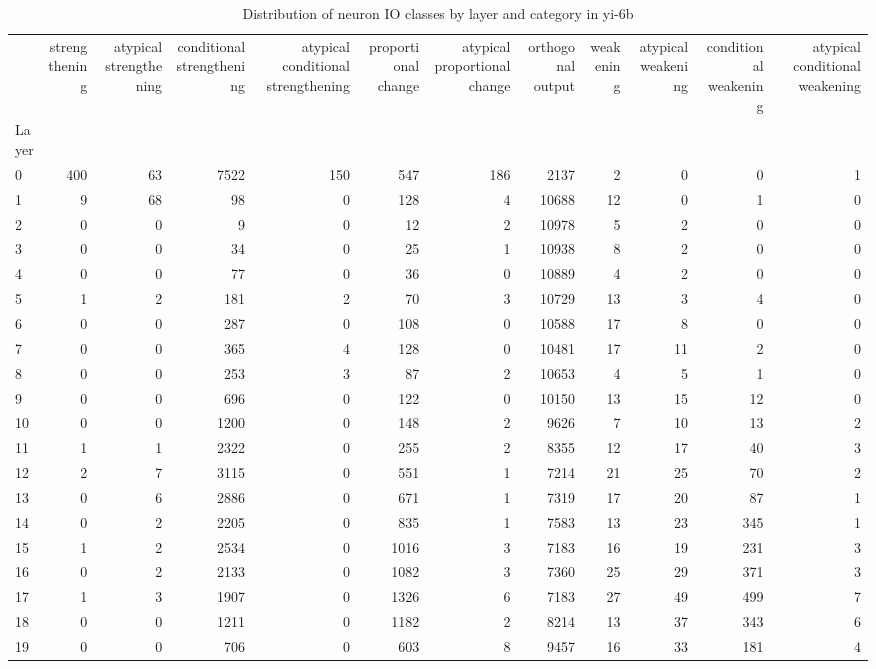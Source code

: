 \begin{table}
\caption{Distribution of neuron IO classes by layer and category in yi-6b}
\label{tab:yi-6b}
\begin{tabular}{lrrrrrrrrrrr}
 & strengthening & atypical strengthening & conditional strengthening & atypical conditional strengthening & proportional change & atypical proportional change & orthogonal output & weakening & atypical weakening & conditional weakening & atypical conditional weakening \\
Layer &  &  &  &  &  &  &  &  &  &  &  \\
0 & 400 & 63 & 7522 & 150 & 547 & 186 & 2137 & 2 & 0 & 0 & 1 \\
1 & 9 & 68 & 98 & 0 & 128 & 4 & 10688 & 12 & 0 & 1 & 0 \\
2 & 0 & 0 & 9 & 0 & 12 & 2 & 10978 & 5 & 2 & 0 & 0 \\
3 & 0 & 0 & 34 & 0 & 25 & 1 & 10938 & 8 & 2 & 0 & 0 \\
4 & 0 & 0 & 77 & 0 & 36 & 0 & 10889 & 4 & 2 & 0 & 0 \\
5 & 1 & 2 & 181 & 2 & 70 & 3 & 10729 & 13 & 3 & 4 & 0 \\
6 & 0 & 0 & 287 & 0 & 108 & 0 & 10588 & 17 & 8 & 0 & 0 \\
7 & 0 & 0 & 365 & 4 & 128 & 0 & 10481 & 17 & 11 & 2 & 0 \\
8 & 0 & 0 & 253 & 3 & 87 & 2 & 10653 & 4 & 5 & 1 & 0 \\
9 & 0 & 0 & 696 & 0 & 122 & 0 & 10150 & 13 & 15 & 12 & 0 \\
10 & 0 & 0 & 1200 & 0 & 148 & 2 & 9626 & 7 & 10 & 13 & 2 \\
11 & 1 & 1 & 2322 & 0 & 255 & 2 & 8355 & 12 & 17 & 40 & 3 \\
12 & 2 & 7 & 3115 & 0 & 551 & 1 & 7214 & 21 & 25 & 70 & 2 \\
13 & 0 & 6 & 2886 & 0 & 671 & 1 & 7319 & 17 & 20 & 87 & 1 \\
14 & 0 & 2 & 2205 & 0 & 835 & 1 & 7583 & 13 & 23 & 345 & 1 \\
15 & 1 & 2 & 2534 & 0 & 1016 & 3 & 7183 & 16 & 19 & 231 & 3 \\
16 & 0 & 2 & 2133 & 0 & 1082 & 3 & 7360 & 25 & 29 & 371 & 3 \\
17 & 1 & 3 & 1907 & 0 & 1326 & 6 & 7183 & 27 & 49 & 499 & 7 \\
18 & 0 & 0 & 1211 & 0 & 1182 & 2 & 8214 & 13 & 37 & 343 & 6 \\
19 & 0 & 0 & 706 & 0 & 603 & 8 & 9457 & 16 & 33 & 181 & 4 \\

\end{tabular}
\end{table}
